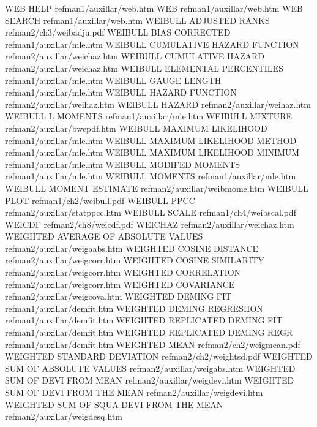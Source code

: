WEB HELP                                refman1/auxillar/web.htm
WEB                                     refman1/auxillar/web.htm
WEB SEARCH                              refman1/auxillar/web.htm
WEIBULL ADJUSTED RANKS                  refman2/ch3/weibadju.pdf
WEIBULL BIAS CORRECTED                  refman1/auxillar/mle.htm
WEIBULL CUMULATIVE HAZARD FUNCTION      refman2/auxillar/weichaz.htm
WEIBULL CUMULATIVE HAZARD               refman2/auxillar/weichaz.htm
WEIBULL ELEMENTAL PERCENTILES           refman1/auxillar/mle.htm
WEIBULL GAUGE LENGTH                    refman1/auxillar/mle.htm
WEIBULL HAZARD FUNCTION                 refman2/auxillar/weihaz.htm
WEIBULL HAZARD                          refman2/auxillar/weihaz.htm
WEIBULL L MOMENTS                       refman1/auxillar/mle.htm
WEIBULL MIXTURE                         refman2/auxillar/bwepdf.htm
WEIBULL MAXIMUM LIKELIHOOD              refman1/auxillar/mle.htm
WEIBULL MAXIMUM LIKELIHOOD METHOD       refman1/auxillar/mle.htm
WEIBULL MAXIMUM LIKELIHOOD MINIMUM      refman1/auxillar/mle.htm
WEIBULL MODIFED MOMENTS                 refman1/auxillar/mle.htm
WEIBULL MOMENTS                         refman1/auxillar/mle.htm
WEIBULL MOMENT ESTIMATE                 refman2/auxillar/weibmome.htm
WEIBULL PLOT                            refman1/ch2/weibull.pdf
WEIBULL PPCC                            refman2/auxillar/statppcc.htm
WEIBULL SCALE                           refman1/ch4/weibscal.pdf
WEICDF                                  refman2/ch8/weicdf.pdf
WEICHAZ                                 refman2/auxillar/weichaz.htm
WEIGHTED AVERAGE OF ABSOLUTE VALUES     refman2/auxillar/weigaabs.htm
WEIGHTED COSINE DISTANCE                refman2/auxillar/weigcorr.htm
WEIGHTED COSINE SIMILARITY              refman2/auxillar/weigcorr.htm
WEIGHTED CORRELATION                    refman2/auxillar/weigcorr.htm
WEIGHTED COVARIANCE                     refman2/auxillar/weigcova.htm
WEIGHTED DEMING FIT                     refman1/auxillar/demfit.htm
WEIGHTED DEMING REGRESIION              refman1/auxillar/demfit.htm
WEIGHTED REPLICATED DEMING FIT          refman1/auxillar/demfit.htm
WEIGHTED REPLICATED DEMING REGR         refman1/auxillar/demfit.htm
WEIGHTED MEAN                           refman2/ch2/weigmean.pdf
WEIGHTED STANDARD DEVIATION             refman2/ch2/weightsd.pdf
WEIGHTED SUM OF ABSOLUTE VALUES         refman2/auxillar/weigabs.htm
WEIGHTED SUM OF DEVI FROM MEAN          refman2/auxillar/weigdevi.htm
WEIGHTED SUM OF DEVI FROM THE MEAN      refman2/auxillar/weigdevi.htm
WEIGHTED SUM OF SQUA DEVI FROM THE MEAN refman2/auxillar/weigdesq.htm
